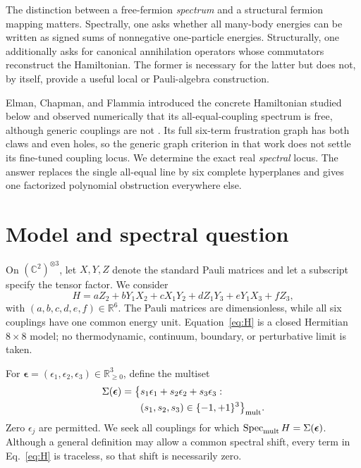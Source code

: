 \documentclass[
  aps,
  pra,
  reprint,
  superscriptaddress,
  nofootinbib,
  longbibliography
]{revtex4-2}
\DeclareMathOperator{\Spec}{Spec}
\newcommand{\R}{\mathbb{R}}
\begin{document}
The distinction between a free-fermion \emph{spectrum} and a structural fermion
mapping matters.  Spectrally, one asks whether all many-body energies can be written as
signed sums of nonnegative one-particle energies.  Structurally, one additionally asks
for canonical annihilation operators whose commutators reconstruct the Hamiltonian.
The former is necessary for the latter but does not, by itself, provide a useful local
or Pauli-algebra construction.

Elman, Chapman, and Flammia introduced the concrete Hamiltonian studied below and
observed numerically that its all-equal-coupling spectrum is free, although generic
couplings are not \cite{Elman2021}.  Its full six-term frustration graph has both claws
and even holes, so the generic graph criterion in that work does not settle its
fine-tuned coupling locus.  We determine the exact real \emph{spectral} locus.  The
answer replaces the single all-equal line by six complete hyperplanes and gives one
factorized polynomial obstruction everywhere else.

\section{Model and spectral question}
\label{sec:model}

On \((\mathbb{C}^{2})^{\otimes3}\), let \(X,Y,Z\) denote the standard Pauli matrices
and let a subscript specify the tensor factor.  We consider
\begin{equation}
 H=aZ_2+bY_1X_2+cX_1Y_2+dZ_1Y_3+eY_1X_3+fZ_3,
 \label{eq:H}
\end{equation}
with \((a,b,c,d,e,f)\in\R^6\).  The Pauli matrices are dimensionless, while all six
couplings have one common energy unit.  Equation~\eqref{eq:H} is a closed Hermitian
\(8\times8\) model; no thermodynamic, continuum, boundary, or perturbative limit is
taken.

For \(\boldsymbol\epsilon=(\epsilon_1,\epsilon_2,\epsilon_3)\in\R_{\geq0}^3\), define
the multiset
\begin{equation}
 \begin{aligned}
 \Sigma(\boldsymbol\epsilon)=\bigl\{&s_1\epsilon_1+s_2\epsilon_2+s_3\epsilon_3:\\
 &(s_1,s_2,s_3)\in\{-1,+1\}^3\bigr\}_{\rm mult}.
 \end{aligned}
 \label{eq:signedset}
\end{equation}
Zero \(\epsilon_j\) are permitted.  We seek all couplings for which
\(\Spec_{\rm mult}H=\Sigma(\boldsymbol\epsilon)\).  Although a general definition may
allow a common spectral shift, every term in Eq.~\eqref{eq:H} is traceless, so that
shift is necessarily zero.
\end{document}
